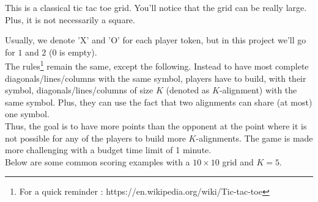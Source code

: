 \documentclass[12pt,a4paper,BCOR12mm, headexclude, footexclude, twoside, openright]{scrartcl}
\numberwithin{equation}{section} %
\numberwithin{figure}{section} %
\numberwithin{table}{section} %
\begin{document}
\begin{center}
\end{center}

This is a classical tic tac toe grid. You'll notice that the grid can be really large. Plus, it is not necessarily a square.

Usually, we denote 'X' and 'O' for each player token, but in this project we'll go for $1$ and $2$ ($0$ is empty).\\

The rules\footnote{For a quick reminder : https://en.wikipedia.org/wiki/Tic-tac-toe} remain the same, except the following. Instead to have most complete diagonals/lines/columns with the same symbol, players have to build, with their symbol, diagonals/lines/columns of size $K$ (denoted as $K$-alignment) with the same symbol. Plus, they can use the fact that two alignments can share (at most) one symbol.\\

Thus, the goal is to have more points than the opponent at the point where it is not possible for any of the players to build more $K$-alignments. The game is made more challenging with a budget time limit of 1 minute.\\

Below are some common scoring examples with a $10 \times 10$ grid and $K = 5$.
\end{document}
